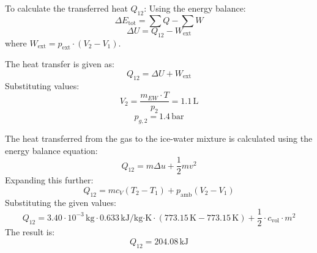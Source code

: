 To calculate the transferred heat \( Q_{12} \):  
Using the energy balance:  
\[
\Delta E_{\text{tot}} = \sum Q - \sum W
\]  
\[
\Delta U = Q_{12} - W_{\text{ext}}
\]  
where \( W_{\text{ext}} = p_{\text{ext}} \cdot (V_2 - V_1) \).  

The heat transfer is given as:  
\[
Q_{12} = \Delta U + W_{\text{ext}}
\]  
Substituting values:  
\[
V_2 = \frac{m_{EW} \cdot T}{p_2} = 1.1 \, \text{L}
\]  
\[
p_{g,2} = 1.4 \, \text{bar}
\]

The heat transferred from the gas to the ice-water mixture is calculated using the energy balance equation:  
\[
Q_{12} = m \Delta u + \frac{1}{2} m v^2
\]  
Expanding this further:  
\[
Q_{12} = m c_V (T_2 - T_1) + p_{\text{amb}} (V_2 - V_1)
\]  
Substituting the given values:  
\[
Q_{12} = 3.40 \cdot 10^{-3} \, \text{kg} \cdot 0.633 \, \text{kJ/kg·K} \cdot (773.15 \, \text{K} - 773.15 \, \text{K}) + \frac{1}{2} \cdot c_{\text{vol}} \cdot m^2
\]  
The result is:  
\[
Q_{12} = 204.08 \, \text{kJ}
\]